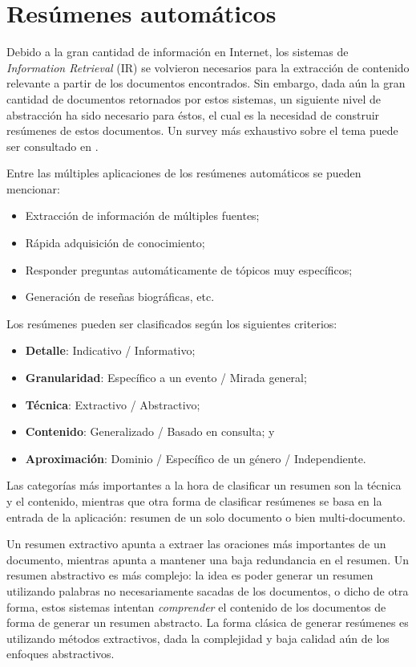 \documentclass[upright, contnum]{umemoria}
\begin{document}
\section{Resúmenes automáticos}
\label{sec-2.4}


   Debido a la gran cantidad de información en Internet, los sistemas
   de \emph{Information Retrieval} (IR) se volvieron necesarios para la
   extracción de contenido relevante a partir de los documentos
   encontrados. Sin embargo, dada aún la gran cantidad de documentos
   retornados por estos sistemas, un siguiente nivel de abstracción ha
   sido necesario para éstos, el cual es la necesidad de construir
   resúmenes de estos documentos\cite{Ganapathiraju_relevanceof}. Un
   survey más exhaustivo sobre el tema puede ser consultado en
   \cite{Das07asurvey}. 

   Entre las múltiples aplicaciones de los resúmenes automáticos se
   pueden mencionar:
\begin{itemize}
\item Extracción de información de múltiples fuentes;
\item Rápida adquisición de conocimiento;
\item Responder preguntas automáticamente de tópicos muy específicos;
\item Generación de reseñas biográficas, etc.
\end{itemize}
   Los resúmenes pueden ser clasificados según los siguientes
   criterios:

\begin{itemize}
\item \textbf{Detalle}: Indicativo / Informativo;
\item \textbf{Granularidad}: Específico a un evento / Mirada general;
\item \textbf{Técnica}: Extractivo / Abstractivo;
\item \textbf{Contenido}: Generalizado / Basado en consulta; y
\item \textbf{Aproximación}: Dominio / Específico de un género /
     Independiente.
\end{itemize}
   Las categorías más importantes a la hora de clasificar un resumen
   son la técnica y el contenido, mientras que otra forma de
   clasificar resúmenes se basa en la entrada de la aplicación:
   resumen de un solo documento o bien multi-documento.

   Un resumen extractivo apunta a
   extraer las oraciones más importantes de un documento, mientras
   apunta a mantener una baja redundancia en el resumen. Un resumen
   abstractivo es más complejo: la idea es poder generar un resumen
   utilizando palabras no necesariamente sacadas de los documentos, o
   dicho de otra forma, estos sistemas intentan \emph{comprender} el
   contenido de los documentos de forma de generar un resumen
   abstracto. La forma clásica de generar resúmenes es utilizando
   métodos extractivos, dada la complejidad y baja calidad aún de los
   enfoques abstractivos.
\end{document}
